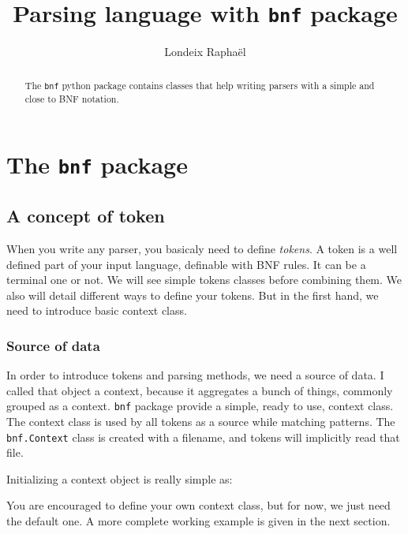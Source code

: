 \documentclass[a4paper]{article}
\title{Parsing language with \texttt{bnf} package}
\author{Londeix Raphaël}
\newcommand{\insertpython}[1]{%
{\ttfamily}%
}
\begin{document}
    \maketitle

    \begin{abstract}
        The \texttt{bnf} python package contains classes that help
        writing parsers with a simple and close to BNF notation.
    \end{abstract}

    \newpage
    \section{The \texttt{bnf} package}
        \subsection{A concept of token}

            When you write any parser, you basicaly need to define
            \textit{tokens}. A token is a well defined part of your
            input language, definable with BNF rules. It can be a
            terminal one or not. We will see simple tokens classes
            before combining them. We also will detail different
            ways to define your tokens. But in the first hand,
            we need to introduce basic context class.

            \subsubsection{Source of data}
                In order to introduce tokens and parsing methods, we need
                a source of data. I called that object a context, because
                it aggregates a bunch of things, commonly grouped as a context.
                \texttt{bnf} package provide a simple, ready to use, context
                class. The context class is used by all tokens as a source
                while matching patterns. The \texttt{bnf.Context} class
                is created with a filename, and tokens will implicitly read
                that file.

                Initializing a context object is really simple as:
                \insertpython{listings/bnf/ex00.py}

                You are encouraged to define your own context class, but for
                now, we just need the default one. A more complete working
                example is given in the next section.
\end{document}
